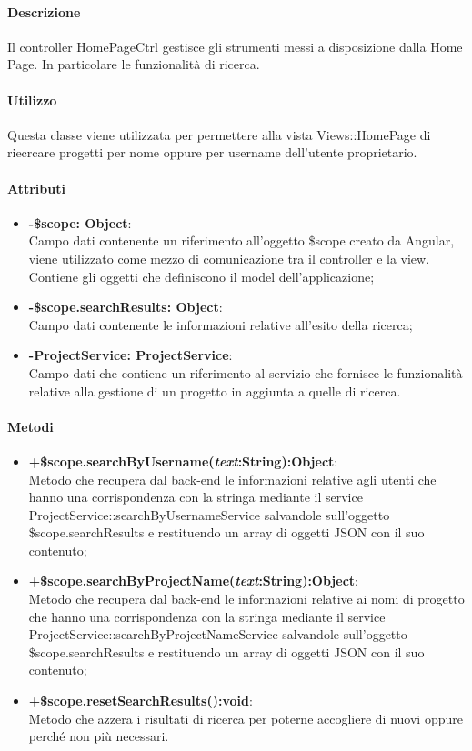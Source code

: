 \paragraph{Descrizione}
Il controller HomePageCtrl gestisce gli strumenti messi a disposizione dalla Home Page. In particolare le funzionalità di ricerca.

\paragraph{Utilizzo}
Questa classe viene utilizzata per permettere alla vista Views::HomePage di riecrcare progetti per nome oppure per username dell'utente proprietario.\\
\paragraph{Attributi}
\begin{itemize}
	\item \textbf{-\$scope: Object}:\\
	Campo dati contenente un riferimento all'oggetto \$scope creato da Angular, viene utilizzato come mezzo di comunicazione tra il controller e la view. Contiene gli oggetti che definiscono il model dell'applicazione;
	\item \textbf{-\$scope.searchResults: Object}:\\
	Campo dati contenente le informazioni relative all'esito della ricerca;
	\item \textbf{-ProjectService: ProjectService}:\\
	Campo dati che contiene un riferimento al servizio che fornisce le funzionalità relative alla gestione di un progetto in aggiunta a quelle di ricerca.
	
\end{itemize}

\paragraph{Metodi}
\begin{itemize}
	\item \textbf{+\$scope.searchByUsername(\textit{text}:String):Object}:\\
	Metodo che recupera dal back-end le informazioni relative agli utenti che hanno una corrispondenza con la stringa mediante il service ProjectService::searchByUsernameService salvandole sull'oggetto \$scope.searchResults e restituendo un array di oggetti JSON con il suo contenuto;
	\item \textbf{+\$scope.searchByProjectName(\textit{text}:String):Object}:\\
	Metodo che recupera dal back-end le informazioni relative ai nomi di progetto che hanno una corrispondenza con la stringa mediante il service ProjectService::searchByProjectNameService salvandole sull'oggetto \$scope.searchResults e restituendo un array di oggetti JSON con il suo contenuto;
	\item \textbf{+\$scope.resetSearchResults():void}:\\
	Metodo che azzera i risultati di ricerca per poterne accogliere di nuovi oppure perché non più necessari.
	
\end{itemize}
